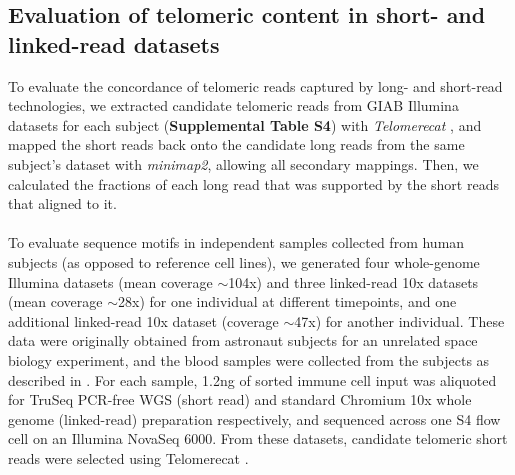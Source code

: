\documentclass{article}
\begin{document}
\subsection*{Evaluation of telomeric content in short- and linked-read datasets}
    To evaluate the concordance of telomeric reads captured by long- and short-read technologies,
        we extracted candidate telomeric reads from GIAB Illumina datasets for each subject (\textbf{Supplemental Table S4})
            with \textit{Telomerecat} \parencite{telomerecat},
            and mapped the short reads back onto the candidate long reads from the same subject's dataset with \textit{minimap2},
            allowing all secondary mappings.
        Then, we calculated the fractions of each long read that was supported by the short reads that aligned to it.
    \\~\\
    To evaluate sequence motifs in independent samples collected from human subjects (as opposed to reference cell lines),
        we generated four whole-genome Illumina datasets (mean coverage $\sim$104x)
        and three linked-read 10x datasets (mean coverage $\sim$28x) for one individual at different timepoints,
        and one additional linked-read 10x dataset (coverage $\sim$47x) for another individual.
    These data were originally obtained from astronaut subjects for an unrelated space biology experiment,
        and the blood samples were collected from the subjects as described in \parencite{twins_study}.
        For each sample, 1.2ng of sorted immune cell input was aliquoted for
            TruSeq PCR-free WGS (short read) and standard Chromium 10x whole genome (linked-read) preparation respectively,
            and sequenced across one S4 flow cell on an Illumina NovaSeq 6000.
    From these datasets, candidate telomeric short reads were selected using Telomerecat \parencite{telomerecat}.
\end{document}
